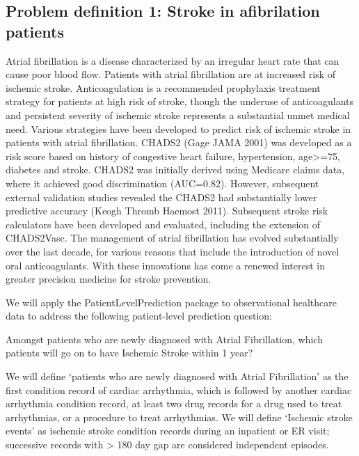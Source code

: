 \documentclass[
]{article}
\begin{document}
\hypertarget{problem-definition-1-stroke-in-afibrilation-patients}{%
\subsection{Problem definition 1: Stroke in afibrilation
patients}\label{problem-definition-1-stroke-in-afibrilation-patients}}

Atrial fibrillation is a disease characterized by an irregular heart
rate that can cause poor blood flow. Patients with atrial fibrillation
are at increased risk of ischemic stroke. Anticoagulation is a
recommended prophylaxis treatment strategy for patients at high risk of
stroke, though the underuse of anticoagulants and persistent severity of
ischemic stroke represents a substantial unmet medical need. Various
strategies have been developed to predict risk of ischemic stroke in
patients with atrial fibrillation. CHADS2 (Gage JAMA 2001) was developed
as a risk score based on history of congestive heart failure,
hypertension, age\textgreater=75, diabetes and stroke. CHADS2 was
initially derived using Medicare claims data, where it achieved good
discrimination (AUC=0.82). However, subsequent external validation
studies revealed the CHADS2 had substantially lower predictive accuracy
(Keogh Thromb Haemost 2011). Subsequent stroke risk calculators have
been developed and evaluated, including the extension of CHADS2Vasc. The
management of atrial fibrillation has evolved substantially over the
last decade, for various reasons that include the introduction of novel
oral anticoagulants. With these innovations has come a renewed interest
in greater precision medicine for stroke prevention.

We will apply the PatientLevelPrediction package to observational
healthcare data to address the following patient-level prediction
question:

Amongst patients who are newly diagnosed with Atrial Fibrillation, which
patients will go on to have Ischemic Stroke within 1 year?

We will define `patients who are newly diagnosed with Atrial
Fibrillation' as the first condition record of cardiac arrhythmia, which
is followed by another cardiac arrhythmia condition record, at least two
drug records for a drug used to treat arrhythmias, or a procedure to
treat arrhythmias. We will define `Ischemic stroke events' as ischemic
stroke condition records during an inpatient or ER visit; successive
records with \textgreater{} 180 day gap are considered independent
episodes.
\end{document}
